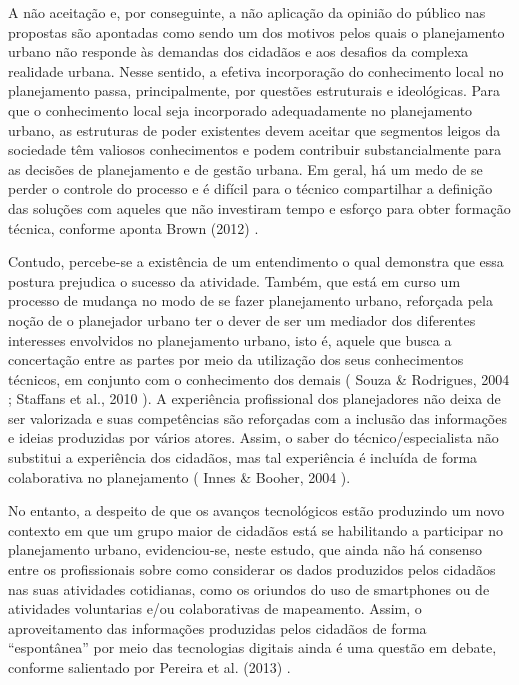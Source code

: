 \documentclass{article}
\begin{document}
A não aceitação e, por conseguinte, a não aplicação da opinião do público nas
				propostas são apontadas como sendo um dos motivos pelos quais o planejamento urbano
				não responde às demandas dos cidadãos e aos desafios da complexa realidade urbana.
				Nesse sentido, a efetiva incorporação do conhecimento local no planejamento passa,
				principalmente, por questões estruturais e ideológicas. Para que o conhecimento
				local seja incorporado adequadamente no planejamento urbano, as estruturas de poder
				existentes devem aceitar que segmentos leigos da sociedade têm valiosos
				conhecimentos e podem contribuir substancialmente para as decisões de planejamento e
				de gestão urbana. Em geral, há um medo de se perder o controle do processo e é
				difícil para o técnico compartilhar a definição das soluções com aqueles que não
				investiram tempo e esforço para obter formação técnica, conforme aponta %
Brown (2012)%
.

Contudo, percebe-se a existência de um entendimento o qual demonstra que essa postura
				prejudica o sucesso da atividade. Também, que está em curso um processo de mudança
				no modo de se fazer planejamento urbano, reforçada pela noção de o planejador urbano
				ter o dever de ser um mediador dos diferentes interesses envolvidos no planejamento
				urbano, isto é, aquele que busca a concertação entre as partes por meio da
				utilização dos seus conhecimentos técnicos, em conjunto com o conhecimento dos
				demais (%
Souza \& Rodrigues, 2004%
; %
Staffans et al., 2010%
). A experiência
				profissional dos planejadores não deixa de ser valorizada e suas competências são
				reforçadas com a inclusão das informações e ideias produzidas por vários atores.
				Assim, o saber do técnico/especialista não substitui a experiência dos cidadãos, mas
				tal experiência é incluída de forma colaborativa no planejamento (%
Innes \& Booher, 2004%
).

No entanto, a despeito de que os avanços tecnológicos estão produzindo um novo
				contexto em que um grupo maior de cidadãos está se habilitando a participar no
				planejamento urbano, evidenciou-se, neste estudo, que ainda não há consenso entre os
				profissionais sobre como considerar os dados produzidos pelos cidadãos nas suas
				atividades cotidianas, como os oriundos do uso de %
smartphones%
 ou de
				atividades voluntarias e/ou colaborativas de mapeamento. Assim, o aproveitamento das
				informações produzidas pelos cidadãos de forma “espontânea” por meio das tecnologias
				digitais ainda é uma questão em debate, conforme salientado por %
Pereira et al. (2013)%
.
\end{document}
